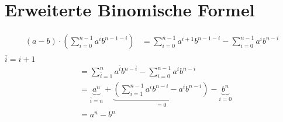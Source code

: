 \documentclass{article}
\let\l\left\let\r\right\let\cs\csname\let\ecs\endcsname\let\ea\expandafter
\begin{document}
\section{Erweiterte Binomische Formel}
\label{sec:extendedBinomial}
\begin{align*}
  (a-b)\cdot\l(\sum_{i=0}^{n-1} a^ib^{n-1-i}\r)
  &= \sum_{i=0}^{n-1} a^{i+1}b^{n-1-i} - \sum_{i=0}^{n-1} a^i b^{n-i}\\
\end{align*}
$\bar i = i+1$
\begin{align*}
  &= \sum_{\bar i = 1}^n a^{\bar i} b^{n-\bar i} - \sum_{i=0}^{n-1} a^i b^{n-i}\\
  &= \underbrace{a^n}_{\bar i=n} + \underbrace{\l(\sum_{i=1}^{n-1} a^i b^{n-i} - a^i b^{n-i}\r)}_{=0} - \underbrace{b^n}_{i=0}\\
  &= a^n - b^n
\end{align*}
\end{document}
